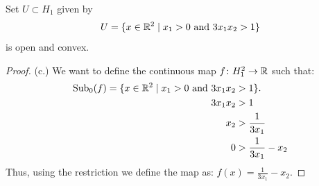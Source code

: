 \documentclass[british]{mscs-project}
\begin{document}
\begin{lemma}
 \label{thm:eulers-identity}
 Set $U \subset H_1$ given by
 \begin{align*}
   U = \{ x \in \mathbb{R}^2 \mid x_1 > 0 \text{ and } 3x_1x_2 >1 \}
 \end{align*}
 is open and convex.
\end{lemma}
\begin{proof}


 (c.) We want to define the continuous map $f \colon H_1^2 \to \mathbb{R}$ such that:
 \begin{align*}
   \text{Sub}_0(f) = \{x \in \mathbb{R}^2 \mid x_1 > 0 \text{ and } 3x_1x_2 &> 1 \}.\\
   3x_1x_2 &> 1  \\
   x_2 &> \frac{1}{3x_1}  \\
   0 &> \frac{1}{3x_1} - x_2
 \end{align*}
 Thus, using the restriction we define the map as: $f(x) = \frac{1}{3x_1} - x_2$.



\end{proof}
\end{document}
